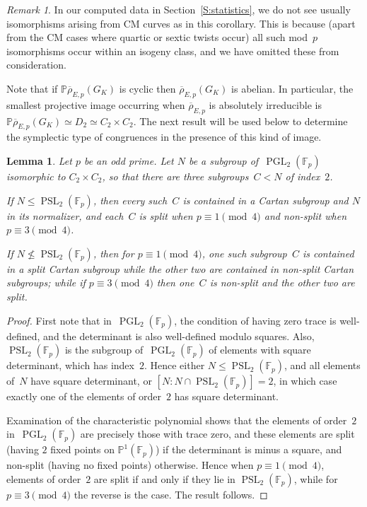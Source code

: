 \documentclass[twoside,leqno,symbols-for-thanks, draft]{rmi}
\numberwithin{equation}{section}
\newcommand{\Fp}{\mathbb{F}_p}
\newcommand{\PP}{\mathbb{P}}
\newcommand{\rhobar}{{\overline{\rho}}}
\newcommand{\PGL}{\operatorname{PGL}}
\newcommand{\PSL}{\operatorname{PSL}}
\newtheorem{lemma}[theorem]{Lemma}
\theoremstyle{remark}
\newtheorem{remark}[theorem]{Remark}
\begin{document}
\begin{remark}
In our computed data in Section~\ref{S:statistics}, we do not see
usually isomorphisms arising from CM curves as in this corollary. This
is because (apart from the CM cases where quartic or sextic twists
occur) all such mod~$p$ isomorphisms occur within an isogeny class,
and we have omitted these from consideration.
\end{remark}

Note that if $\PP\rhobar_{E,p} (G_K)$ is cyclic  then 
$\rhobar_{E,p} (G_K)$ is abelian. 
In particular, the smallest projective image occurring when $\rhobar_{E,p}$ is absolutely irreducible is 
$\PP\rhobar_{E,p} (G_K) \simeq D_2 \simeq C_2 \times C_2$. The next
result will be used below to determine the symplectic type of
congruences in the presence of this kind of image.

\begin{lemma}\label{L:C2xC2}
Let $p$ be an odd prime.  Let $N$ be a subgroup of~$\PGL_2(\Fp)$
isomorphic to $C_2\times C_2$, so that there are three subgroups~$C< N$
of index~$2$.

If $N\le\PSL_2(\Fp)$, then every such~$C$ is contained in a Cartan
subgroup and $N$ in its normalizer, and each~$C$ is split when
$p\equiv1\pmod4$ and non-split when $p\equiv3\pmod4$.

If $N\not\le\PSL_2(\Fp)$, then for $p\equiv1\pmod4$, one such
subgroup~$C$ is contained in a split Cartan subgroup while the other
two are contained in non-split Cartan subgroups; while if
$p\equiv3\pmod4$ then one~$C$ is non-split and the other two are
split.
\end{lemma}

\begin{proof}
  First note that in~$\PGL_2(\Fp)$, the condition of having zero
  trace is well-defined, and the determinant is also well-defined
  modulo squares.  Also, $\PSL_2(\Fp)$ is the subgroup of~$\PGL_2(\Fp)$ of elements with
  square determinant, which has index~$2$.  Hence either
  $N\le\PSL_2(\Fp)$, and all elements of~$N$ have square determinant,
  or $[N:N\cap\PSL_2(\Fp)]=2$, in which case exactly one of the
  elements of order~$2$ has square determinant.

  Examination of the characteristic polynomial shows that the elements
  of order~$2$ in~$\PGL_2(\Fp)$ are precisely those with trace zero,
  and these elements are split (having $2$ fixed points on
  $\PP^1(\Fp)$) if the determinant is minus a square, and non-split
  (having no fixed points) otherwise.  Hence when $p\equiv1\pmod4$,
  elements of order~$2$ are split if and only if they lie in
  $\PSL_2(\Fp)$, while for $p\equiv3\pmod4$ the reverse is the case.
  The result follows.
\end{proof}
\end{document}
